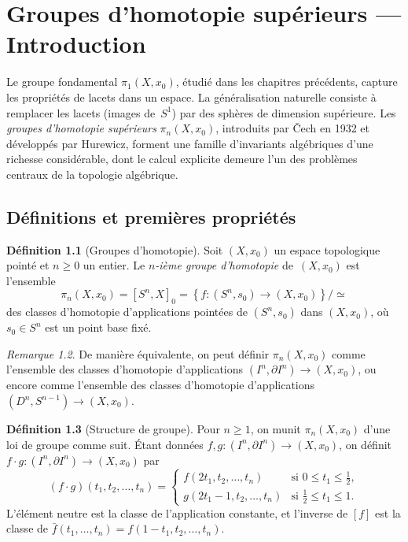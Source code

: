 \documentclass[12pt,a4paper,openany]{book}
\theoremstyle{definition}
\newtheorem{definition}{Définition}[chapter]
\theoremstyle{plain}
\theoremstyle{remark}
\newtheorem{remarque}[definition]{Remarque}
\newcommand{\set}[1]{\left\{#1\right\}}
\begin{document}
\chapter{Groupes d'homotopie supérieurs --- Introduction}\label{chap:homotopie-sup}

Le groupe fondamental $\pi_1(X, x_0)$, étudié dans les chapitres précédents,
capture les propriétés de lacets dans un espace. La généralisation naturelle consiste
à remplacer les lacets (images de~$S^1$) par des sphères de dimension
supérieure. Les \emph{groupes d'homotopie supérieurs} $\pi_n(X, x_0)$, introduits
par \v{C}ech en 1932 et développés par Hurewicz, forment une famille d'invariants
algébriques d'une richesse considérable, dont le calcul explicite demeure l'un des
problèmes centraux de la topologie algébrique.

\section{Définitions et premières propriétés}\label{sec:def-homotopie-sup}

\begin{definition}[Groupes d'homotopie]\label{def:pi-n}
  Soit $(X, x_0)$ un espace topologique pointé et $n \geq 0$ un entier. Le
  \emph{$n$-ième groupe d'homotopie} de~$(X, x_0)$ est l'ensemble
  \[
    \pi_n(X, x_0) = [S^n, X]_0 = \set{f \colon (S^n, s_0) \to (X, x_0)} / {\simeq}
  \]
  des classes d'homotopie d'applications pointées de $(S^n, s_0)$ dans $(X, x_0)$,
  où $s_0 \in S^n$ est un point base fixé.
\end{definition}

\begin{remarque}\label{rem:pi-n-equivalences}
  De manière équivalente, on peut définir $\pi_n(X, x_0)$ comme l'ensemble des
  classes d'homotopie d'applications $(I^n, \partial I^n) \to (X, x_0)$, ou encore
  comme l'ensemble des classes d'homotopie d'applications
  $(D^n, S^{n-1}) \to (X, x_0)$.
\end{remarque}

\begin{definition}[Structure de groupe]\label{def:pi-n-groupe}
  Pour $n \geq 1$, on munit $\pi_n(X, x_0)$ d'une loi de groupe comme suit. Étant
  données $f, g \colon (I^n, \partial I^n) \to (X, x_0)$, on définit
  $f \cdot g \colon (I^n, \partial I^n) \to (X, x_0)$ par
  \[
    (f \cdot g)(t_1, t_2, \ldots, t_n) =
    \begin{cases}
      f(2t_1, t_2, \ldots, t_n) & \text{si } 0 \leq t_1 \leq \tfrac{1}{2}, \\
      g(2t_1 - 1, t_2, \ldots, t_n) & \text{si } \tfrac{1}{2} \leq t_1 \leq 1.
    \end{cases}
  \]
  L'élément neutre est la classe de l'application constante, et l'inverse de $[f]$ est
  la classe de $\bar{f}(t_1, \ldots, t_n) = f(1-t_1, t_2, \ldots, t_n)$.
\end{definition}
\end{document}
